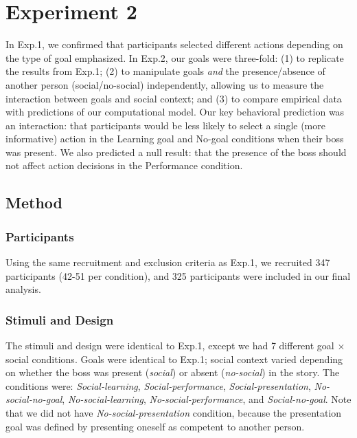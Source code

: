 \documentclass[10pt, letterpaper]{article}
\begin{document}
\section{Experiment 2}\label{experiment-2}

In Exp.1, we confirmed that participants selected different actions
depending on the type of goal emphasized. In Exp.2, our goals were
three-fold: (1) to replicate the results from Exp.1; (2) to manipulate
goals \emph{and} the presence/absence of another person
(social/no-social) independently, allowing us to measure the interaction
between goals and social context; and (3) to compare empirical data with
predictions of our computational model. Our key behavioral prediction
was an interaction: that participants would be less likely to select a
single (more informative) action in the Learning goal and No-goal
conditions when their boss was present. We also predicted a null result:
that the presence of the boss should not affect action decisions in the
Performance condition.

\subsection{Method}\label{method-1}

\subsubsection{Participants}\label{participants-1}

Using the same recruitment and exclusion criteria as Exp.1, we recruited
347 participants (42-51 per condition), and 325 participants were
included in our final analysis.

\subsubsection{Stimuli and Design}\label{stimuli-and-design-1}

The stimuli and design were identical to Exp.1, except we had 7
different goal \(\times\) social conditions. Goals were identical to
Exp.1; social context varied depending on whether the boss was present
(\emph{social}) or absent (\emph{no-social}) in the story. The
conditions were: \emph{Social-learning}, \emph{Social-performance},
\emph{Social-presentation}, \emph{No-social-no-goal},
\emph{No-social-learning}, \emph{No-social-performance}, and
\emph{Social-no-goal}. Note that we did not have
\emph{No-social-presentation} condition, because the presentation goal
was defined by presenting oneself as competent to another person.
\end{document}
